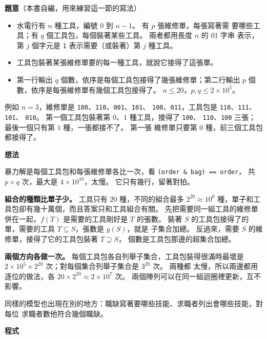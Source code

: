 \textbf{題意}（本書自編，用來練習這一節的寫法）

\begin{itemize}
\item 水電行有 $n$ 種工具，編號 $0$ 到 $n - 1$。 有 $p$ 張維修單，每張寫著需
要哪些工具；有 $q$ 個工具包，每個裝著某些工具。 兩者都用長度 $n$ 的 01 字串
表示，第 $j$ 個字元是 \texttt{1} 表示需要（或裝著）第 $j$ 種工具。
\item 工具包裝著某張維修單要的每一種工具，就說它接得了這張單。
\item 第一行輸出 $q$ 個數，依序是每個工具包接得了幾張維修單；第二行輸出 $p$
個數，依序是每張維修單有幾個工具包接得了。 $n \le 20$，$p, q \le 2 \times 10^5$。
\end{itemize}

例如 $n = 3$，維修單是 \texttt{100}、\texttt{110}、\texttt{001}、\texttt{101}、
\texttt{100}、\texttt{011}，工具包是 \texttt{110}、\texttt{111}、\texttt{101}、
\texttt{010}。 第一個工具包裝著第 $0$、$1$ 種工具，接得了 \texttt{100}、
\texttt{110}、\texttt{100} 三張；最後一個只有第 $1$ 種，一張都接不了。 第一張
維修單只要第 $0$ 種，前三個工具包都接得了。

\textbf{想法}

暴力解是每個工具包和每張維修單各比一次，看 \texttt{(order \& bag) == order}，
共 $p \times q$ 次，最大是 $4 \times 10^{10}$，太慢。 它只有幾行，留著對拍。

\textbf{組合的種類比單子少。} 工具只有 $20$ 種，不同的組合最多
$2^{20} \approx 10^6$ 種，單子和工具包卻有幾十萬個，而且答案只和工具組合有關。
先把需要同一組工具的維修單併在一起，$f(T)$ 是需要的工具剛好是 $T$ 的張數。
裝著 $S$ 的工具包接得了的單，需要的工具 $T \subseteq S$，張數是 $g(S)$，就是
子集合加總。 反過來，需要 $S$ 的維修單，接得了它的工具包裝著 $T \supseteq S$，
個數是工具包那邊的超集合加總。

\textbf{兩個方向各做一次。} 每個工具包各自列舉子集合，工具包裝得很滿時最壞是
$2 \times 10^5 \times 2^{20}$ 次；對每個集合列舉子集合是 $3^{20}$ 次。 兩種都
太慢，所以兩邊都用逐位的做法，各 $20 \times 2^{20} \approx 2 \times 10^7$ 次。
兩個陣列可以在同一組迴圈裡更新，互不影響。

同樣的模型也出現在別的地方：職缺寫著要哪些技能、求職者列出會哪些技能，對每位
求職者數他符合幾個職缺。

\textbf{程式}

